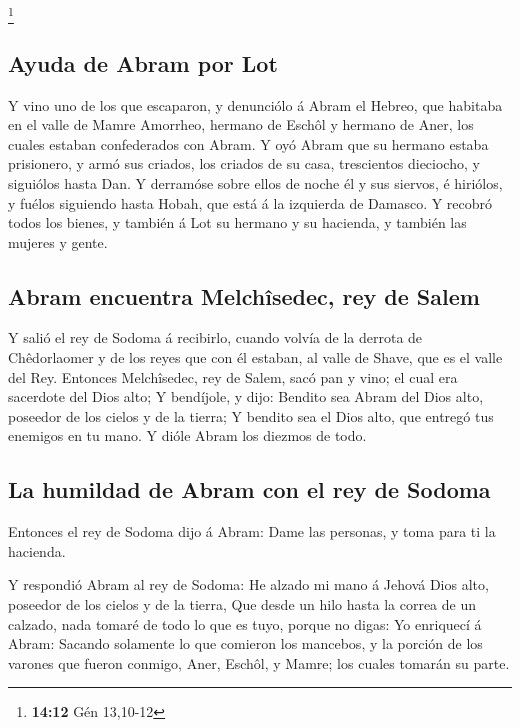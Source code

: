 \footnote{\textbf{14:12} Gén 13,10-12}

\hypertarget{ayuda-de-abram-por-lot}{%
\subsection{Ayuda de Abram por Lot}\label{ayuda-de-abram-por-lot}}

 Y vino uno de los que escaparon, y denunciólo á Abram el
Hebreo, que habitaba en el valle de Mamre Amorrheo, hermano de Eschôl y
hermano de Aner, los cuales estaban confederados con Abram.
 Y oyó Abram que su hermano estaba prisionero, y armó sus
criados, los criados de su casa, trescientos dieciocho, y siguiólos
hasta Dan.  Y derramóse sobre ellos de noche él y sus
siervos, é hiriólos, y fuélos siguiendo hasta Hobah, que está á la
izquierda de Damasco.  Y recobró todos los bienes, y
también á Lot su hermano y su hacienda, y también las mujeres y gente.

\hypertarget{abram-encuentra-melchuxeesedec-rey-de-salem}{%
\subsection{Abram encuentra Melchîsedec, rey de
Salem}\label{abram-encuentra-melchuxeesedec-rey-de-salem}}

 Y salió el rey de Sodoma á recibirlo, cuando volvía de
la derrota de Chêdorlaomer y de los reyes que con él estaban, al valle
de Shave, que es el valle del Rey.  Entonces Melchîsedec,
rey de Salem, sacó pan y vino; el cual era sacerdote del Dios alto;
 Y bendíjole, y dijo: Bendito sea Abram del Dios alto,
poseedor de los cielos y de la tierra;  Y bendito sea el
Dios alto, que entregó tus enemigos en tu mano. Y dióle Abram los
diezmos de todo.

\hypertarget{la-humildad-de-abram-con-el-rey-de-sodoma}{%
\subsection{La humildad de Abram con el rey de
Sodoma}\label{la-humildad-de-abram-con-el-rey-de-sodoma}}

 Entonces el rey de Sodoma dijo á Abram: Dame las
personas, y toma para ti la hacienda.

 Y respondió Abram al rey de Sodoma: He alzado mi mano á
Jehová Dios alto, poseedor de los cielos y de la tierra, 
Que desde un hilo hasta la correa de un calzado, nada tomaré de todo lo
que es tuyo, porque no digas: Yo enriquecí á Abram: 
Sacando solamente lo que comieron los mancebos, y la porción de los
varones que fueron conmigo, Aner, Eschôl, y Mamre; los cuales tomarán su
parte.


